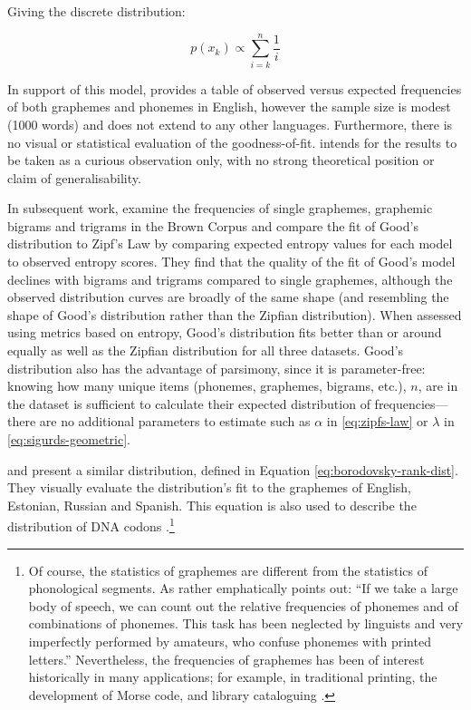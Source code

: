 Giving the discrete distribution:

\begin{equation}
p(x_k) \propto \sum_{i=k}^{n} \frac{1}{i}
\label{eq:whitworth-rank-dist}
\end{equation}

In support of this model, \textcite[p.577]{good_statistics_1969} provides a table of observed versus expected frequencies of both graphemes and phonemes in English, however the sample size is modest (1000 words) and does not extend to any other languages. Furthermore, there is no visual or statistical evaluation of the goodness-of-fit. \textcite{good_statistics_1969} intends for the results to be taken as a curious observation only, with no strong theoretical position or claim of generalisability.

In subsequent work, \textcite[pp.~563--566]{witten_source_1990} examine the frequencies of single graphemes, graphemic bigrams and trigrams in the Brown Corpus and compare the fit of Good's distribution to Zipf's Law by comparing expected entropy values for each model to observed entropy scores. They find that the quality of the fit of Good's model declines with bigrams and trigrams compared to single graphemes, although the observed distribution curves are broadly of the same shape (and resembling the shape of Good's distribution rather than the Zipfian distribution). When assessed using metrics based on entropy, Good's distribution fits better than or around equally as well as the Zipfian distribution for all three datasets. Good's distribution also has the advantage of parsimony, since it is parameter-free: knowing how many unique items (phonemes, graphemes, bigrams, etc.), \(n\), are in the dataset is sufficient to calculate their expected distribution of frequencies---there are no additional parameters to estimate such as \(\alpha\) in \eqref{eq:zipfs-law} or \(\lambda\) in \eqref{eq:sigurds-geometric}.

\textcite{gusein-zade_distribution_1988} and \textcite{borodovsky_general_1989} present a similar distribution, defined in Equation \eqref{eq:borodovsky-rank-dist}. They visually evaluate the distribution's fit to the graphemes of English, Estonian, Russian and Spanish. This equation is also used to describe the distribution of DNA codons \autocite{borodovsky_general_1989}.\footnote{Of course, the statistics of graphemes are different from the statistics of phonological segments. As \textcite[pp.~136--137]{bloomfield_language_1935} rather emphatically points out: ``If we take a large body of speech, we can count out the relative frequencies of phonemes and of combinations of phonemes. This task has been neglected by linguists and very imperfectly performed by amateurs, who confuse phonemes with printed letters.'' Nevertheless, the frequencies of graphemes has been of interest historically in many applications; for example, in traditional printing, the development of Morse code, and library cataloguing \autocite[pp.~550--551]{witten_source_1990}.}

